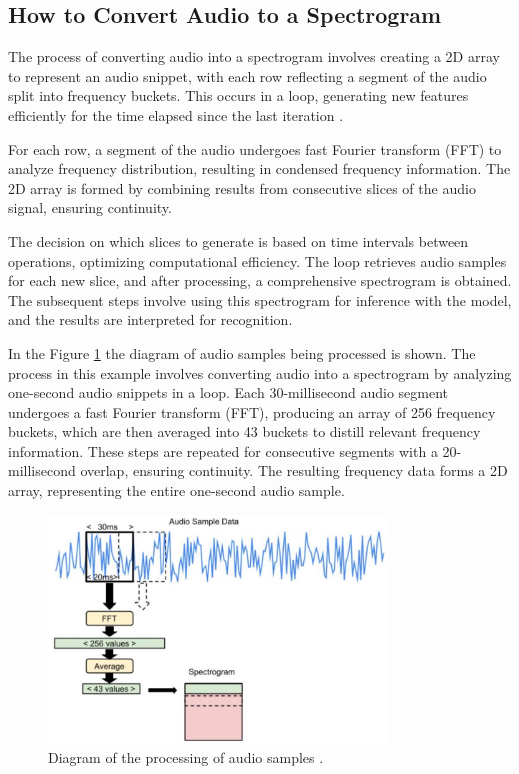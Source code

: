 \subsection{How to Convert Audio to a Spectrogram}
\label{subsection:convertAudio}

The process of converting audio into a spectrogram involves creating a 2D array to represent an audio snippet, with each row reflecting a segment of the audio split into frequency buckets. This occurs in a loop, generating new features efficiently for the time elapsed since the last iteration \cite{Warden:2019}.

For each row, a segment of the audio undergoes fast Fourier transform (FFT) to analyze frequency distribution, resulting in condensed frequency information. The 2D array is formed by combining results from consecutive slices of the audio signal, ensuring continuity.

The decision on which slices to generate is based on time intervals between operations, optimizing computational efficiency. The loop retrieves audio samples for each new slice, and after processing, a comprehensive spectrogram is obtained. The subsequent steps involve using this spectrogram for inference with the model, and the results are interpreted for recognition.

In the Figure \ref{fig:audioProcessings} the diagram of audio samples being processed is shown. The process in this example involves converting audio into a spectrogram by analyzing one-second audio snippets in a loop. Each 30-millisecond audio segment undergoes a fast Fourier transform (FFT), producing an array of 256 frequency buckets, which are then averaged into 43 buckets to distill relevant frequency information. These steps are repeated for consecutive segments with a 20-millisecond overlap, ensuring continuity. The resulting frequency data forms a 2D array, representing the entire one-second audio sample.

\begin{figure}[h!]
	\centering
	\includegraphics[width=0.8\textwidth]{Images/DataMining/audioProcessing.jpg}
	\caption{Diagram of the processing of audio samples \cite{Warden:2019}.} 
	\label{fig:audioProcessings}
\end{figure}


